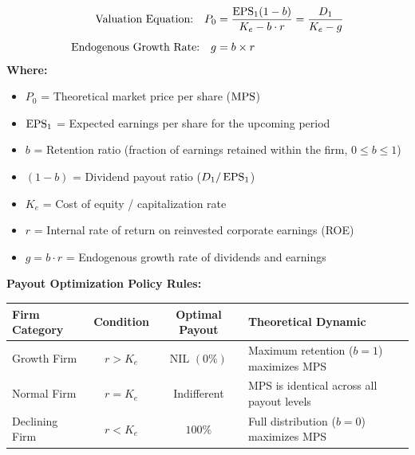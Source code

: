 \begin{formulabox}
\begin{align*}
    \text{Valuation Equation:} \quad P_0 &= \frac{\operatorname{EPS}_1 (1 - b)}{K_e - b \cdot r} = \frac{D_1}{K_e - g} \\[4pt]
    \text{Endogenous Growth Rate:} \quad g &= b \times r
\end{align*}
\textbf{Where:}
\begin{itemize}[noitemsep, topsep=2pt]
    \item $P_0$ = Theoretical market price per share ($\operatorname{MPS}$)
    \item $\operatorname{EPS}_1$ = Expected earnings per share for the upcoming period
    \item $b$ = Retention ratio (fraction of earnings retained within the firm, $0 \le b \le 1$)
    \item $(1 - b)$ = Dividend payout ratio ($D_1 / \operatorname{EPS}_1$)
    \item $K_e$ = Cost of equity / capitalization rate
    \item $r$ = Internal rate of return on reinvested corporate earnings (ROE)
    \item $g = b \cdot r$ = Endogenous growth rate of dividends and earnings
\end{itemize}
\vspace{0.4em}
\textbf{Payout Optimization Policy Rules:}
\begin{center}
\small
\begin{tabularx}{\linewidth}{l c c X}
    \toprule
    \textbf{Firm Category} & \textbf{Condition} & \textbf{Optimal Payout} & \textbf{Theoretical Dynamic} \\
    \midrule
    Growth Firm & $r > K_e$ & $\text{NIL } (0\%)$ & Maximum retention ($b=1$) maximizes MPS \\
    Normal Firm & $r = K_e$ & Indifferent & MPS is identical across all payout levels \\
    Declining Firm & $r < K_e$ & $100\%$ & Full distribution ($b=0$) maximizes MPS \\
    \bottomrule
\end{tabularx}
\end{center}
\end{formulabox}

